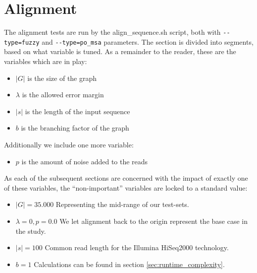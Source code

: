 \documentclass[thesis.tex]{subfiles}
\begin{document}
\section{Alignment}
The alignment tests are run by the align\_sequence.sh script, both with \texttt{-{}-type=fuzzy} and \texttt{-{}-type=po\_msa} parameters. The section is divided into segments, based on what variable is tuned. As a remainder to the reader, these are the variables which are in play:
\begin{itemize}
  \item $|G|$ is the size of the graph
  \item $\lambda$ is the allowed error margin
  \item $|s|$ is the length of the input sequence
  \item $b$ is the branching factor of the graph
\end{itemize}
Additionally we include one more variable:
\begin{itemize}
  \item $p$ is the amount of noise added to the reads
\end{itemize}
As each of the subsequent sections are concerned with the impact of exactly one of these variables, the ``non-important'' variables are locked to a standard value:
\begin{itemize}
  \item \textbf{$|G|=35.000$} Representing the mid-range of our test-sets.
  \item \textbf{$\lambda=0, p=0.0$} We let alignment back to the origin represent the base case in the study.
  \item \textbf{$|s|=100$} Common read length for the Illumina HiSeq2000 technology.
  \item \textbf{$b=1$} Calculations can be found in section \ref{sec:runtime_complexity}.
\end{itemize}
\end{document}
